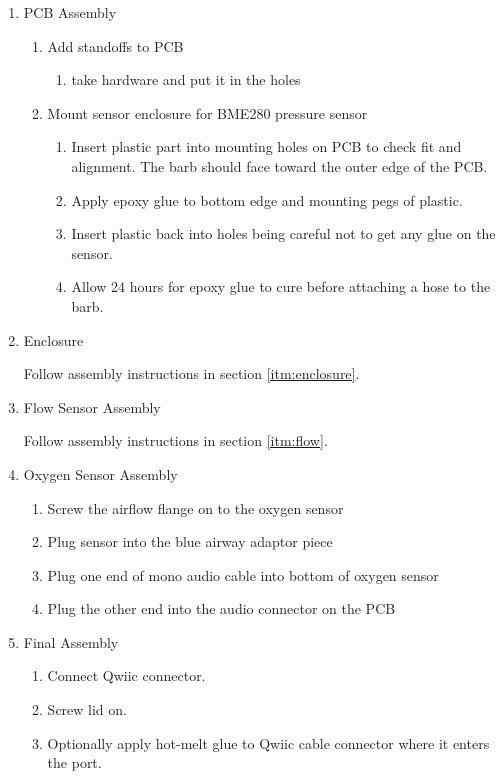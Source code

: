 \documentclass[11pt, letterpaper]{article}
\begin{document}
\begin{enumerate}
\item
PCB Assembly

\begin{enumerate}[label=1.\arabic*]
\item Add standoffs to PCB
\begin{enumerate}[label=1.1.\arabic*]
\item take hardware and put it in the holes
\end{enumerate}

\item Mount sensor enclosure for BME280 pressure sensor
\begin{enumerate}[label=1.2.\arabic*]
\item Insert plastic part into mounting holes on PCB to check fit and alignment. The barb should face toward the outer edge of the PCB.
\item Apply epoxy glue to bottom edge and mounting pegs of plastic.
\item Insert plastic back into holes being careful not to get any glue on the sensor.
\item Allow 24 hours for epoxy glue to cure before attaching a hose to the barb.
\end{enumerate}


\end{enumerate}



\item
Enclosure

Follow assembly instructions in section \ref{itm:enclosure}.


\item
Flow Sensor Assembly

Follow assembly instructions in section \ref{itm:flow}.

\item
Oxygen Sensor Assembly

\begin{enumerate}[label=4.\arabic*]
\item
Screw the airflow flange on to the oxygen sensor
\item
Plug sensor into the blue airway adaptor piece
\item
Plug one end of mono audio cable into bottom of oxygen sensor
\item
Plug the other end into the audio connector on the PCB
\end{enumerate}








\item
  Final Assembly
  \begin{enumerate}[label=4.\arabic*]
  \item Connect Qwiic connector.
  \item Screw lid on.
    \item Optionally apply hot-melt glue to Qwiic cable connector where it enters the port.
    \end{enumerate}

\end{enumerate}
\end{document}
